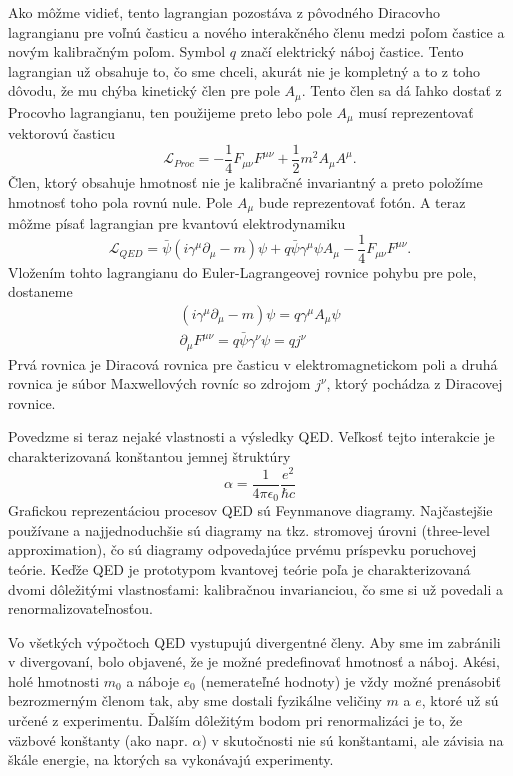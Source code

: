 \documentclass[../../main.tex]{subfiles}
\begin{document}
Ako môžme vidieť, tento lagrangian pozostáva z pôvodného Diracovho lagrangianu pre voľnú časticu a nového interakčného členu medzi poľom častice a novým kalibračným poľom. Symbol $q$ značí elektrický náboj častice. Tento lagrangian už obsahuje to, čo sme chceli, akurát nie je kompletný a to z toho dôvodu, že mu chýba kinetický člen pre pole $A_{\mu}$. Tento člen sa dá ľahko dostať z Procovho lagrangianu, ten použijeme preto lebo pole $A_{\mu}$ musí reprezentovať vektorovú časticu
\begin{equation}
\mathcal{L}_{Proc}=-\frac{1}{4}F_{\mu\nu}F^{\mu\nu}+\frac{1}{2}m^2A_{\mu}A^{\mu}.
\end{equation}
Člen, ktorý obsahuje hmotnosť nie je kalibračné invariantný a preto položíme hmotnosť toho pola rovnú nule. Pole $A_{\mu}$ bude reprezentovať fotón. A teraz môžme písať lagrangian pre kvantovú elektrodynamiku
\begin{equation}
\mathcal{L}_{QED}=\bar{\psi}(i\gamma^{\mu}\partial_{\mu}-m)\psi+q\bar{\psi}\gamma^{\mu}\psi A_{\mu}-\frac{1}{4}F_{\mu\nu}F^{\mu\nu}.
\end{equation}
Vložením tohto lagrangianu do Euler-Lagrangeovej rovnice pohybu pre pole, dostaneme 
\begin{equation}
\begin{gathered}
(i\gamma^{\mu}\partial_{\mu}-m)\psi=q\gamma^{\mu}A_{\mu}\psi\\
\partial_{\mu}F^{\mu\nu}=q\bar{\psi}\gamma^{\nu}\psi=qj^{\nu}
\end{gathered}
\end{equation}
Prvá rovnica je Diracová rovnica pre časticu v elektromagnetickom poli a druhá rovnica je súbor Maxwellových rovníc so zdrojom $j^{\nu}$, ktorý pochádza z Diracovej rovnice.

Povedzme si teraz nejaké vlastnosti a výsledky QED. Veľkosť tejto interakcie je charakterizovaná konštantou jemnej štruktúry
\begin{equation}
\alpha=\frac{1}{4\pi \epsilon_0}\frac{e^2}{\hbar c}
\end{equation}
Grafickou reprezentáciou procesov QED sú Feynmanove diagramy. Najčastejšie používane a najjednoduchšie sú diagramy na tkz. stromovej úrovni (three-level approximation), čo sú diagramy odpovedajúce prvému príspevku poruchovej teórie. Keďže QED je prototypom kvantovej teórie poľa je charakterizovaná dvomi dôležitými vlastnosťami: kalibračnou invarianciou, čo sme si už povedali a renormalizovateľnosťou.

Vo všetkých výpočtoch QED vystupujú divergentné členy. Aby sme im zabránili v divergovaní, bolo objavené, že je možné predefinovať hmotnosť a náboj. Akési, holé hmotnosti $m_0$ a náboje $e_0$ (nemerateľné hodnoty) je vždy možné prenásobiť bezrozmerným členom tak, aby sme dostali fyzikálne veličiny $m$ a $e$, ktoré už sú určené z experimentu. Ďalším dôležitým bodom pri renormalizáci je to, že väzbové konštanty (ako napr. $\alpha$) v skutočnosti nie sú konštantami, ale závisia na škále energie, na ktorých sa vykonávajú experimenty.
\end{document}

